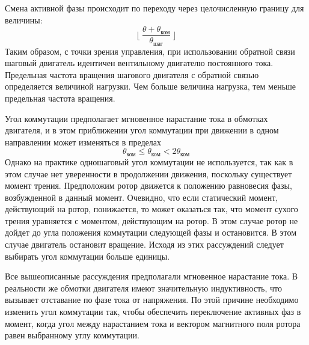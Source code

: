 Смена активной фазы происходит по переходу через целочисленную границу для величины:
$$
    \lfloor ~\frac{\theta + \theta_\textit{ком}}{\theta_\textit{шаг}}~ \rfloor
$$
Таким образом, с точки зрения управления, при использовании обратной связи
шаговый двигатель идентичен вентильному двигателю постоянного тока.
Предельная частота вращения шагового двигателя с обратной связью определяется
величиной нагрузки. Чем больше величина нагрузка, тем меньше предельная частота
вращения.

Угол коммутации предполагает мгновенное нарастание тока в обмотках двигателя, и
в этом приближении угол коммутации при движении в одном направлении может
изменяться в пределах
$$
    \theta_\textit{ком} \leq \theta_\textit{ком} < 2\theta_\textit{ком}
$$
Однако на практике одношаговый угол коммутации не используется, так как в этом случае нет
уверенности в продолжении движения, поскольку существует момент трения. Предположим ротор движется к
положению равновесия фазы, возбужденной в данный момент. Очевидно, что если статический момент, действующий
на ротор, понижается, то может оказаться так, что момент сухого трения уравняется с моментом,
действующим на ротор. В этом случае ротор не дойдет до угла положения коммутации следующей фазы и
остановится. В этом случае двигатель остановит вращение. Исходя из этих рассуждений следует
выбирать угол коммутации больше единицы.

Все вышеописанные рассуждения предполагали мгновенное нарастание тока. В реальности же обмотки двигателя
имеют значительную индуктивность, что вызывает отставание по фазе тока от напряжения.
По этой причине необходимо изменить угол коммутации так, чтобы обеспечить переключение активных фаз
в момент, когда угол между нарастанием тока и вектором магнитного поля ротора равен выбранному углу коммутации.

